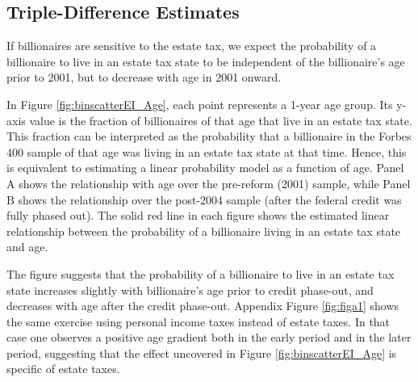 \documentclass[12pt]{article}
\begin{document}
\subsection{Triple-Difference Estimates}

If billionaires are sensitive to the estate tax, we expect the probability of a billionaire to live in an estate tax state to be independent of the billionaire's age prior to 2001, but to decrease with age in 2001 onward. 


In Figure \ref{fig:binscatterEI_Age}, each point represents a 1-year age group. Its y-axis value is the fraction of billionaires of that age that live in an estate tax state. This fraction can be interpreted as the probability that a billionaire in the Forbes 400 sample of that age was living in an estate tax state at that time. Hence, this is equivalent to estimating a linear probability model as a function of age. Panel A shows the relationship with age over the pre-reform (2001) sample, while Panel B shows the relationship over the post-2004 sample (after the federal credit was fully phased out). The solid red line in each figure shows the estimated linear relationship between the probability of a billionaire living in an estate tax state and age. 

The figure suggests that the probability of a billionaire to live in an estate tax state increases slightly with billionaire's age prior to credit phase-out, and decreases with age after the credit phase-out. 
Appendix Figure \ref{fig:figa1} shows the same exercise using personal income taxes instead of estate taxes. In that case one observes a positive age gradient both in the early period and in the later period, suggesting that the effect uncovered in Figure  \ref{fig:binscatterEI_Age} is specific of estate taxes. 
\end{document}
